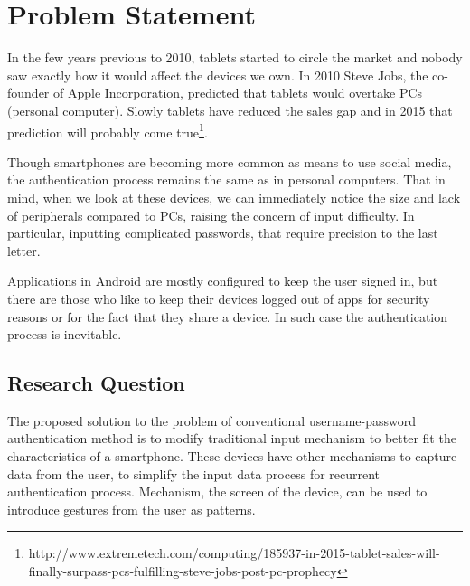 
\chapter{Problem Statement} %

In the few years previous to 2010, tablets started to circle the market and nobody saw exactly how it would affect the devices we own. In 2010 Steve Jobs, the co-founder of Apple Incorporation, predicted that tablets would overtake PCs (personal computer). Slowly tablets have reduced the sales gap and in 2015 that prediction will probably come true\footnote[11]{http://www.extremetech.com/computing/185937-in-2015-tablet-sales-will-finally-surpass-pcs-fulfilling-steve-jobs-post-pc-prophecy}.

Though smartphones are becoming more common as means to use social media, the authentication process remains the same as in personal computers. That in mind, when we look at these devices, we can immediately notice the size and lack of peripherals compared to PCs, raising the concern of input difficulty. In particular, inputting complicated passwords, that require precision to the last letter. 

Applications in Android are mostly configured to keep the user signed in, but there are those who like to keep their devices logged out of apps for security reasons or for the fact that they share a device. In such case the authentication process is inevitable.




\ifpdf
    \graphicspath{{X/figures/PNG/}{X/figures/PDF/}{X/figures/}}
\else
    \graphicspath{{X/figures/EPS/}{X/figures/}}
\fi

\section{Research Question}
The proposed solution to the problem of conventional username-password authentication method is to modify traditional input mechanism to better fit the characteristics of a smartphone. These devices have other mechanisms to capture data from the user, to simplify the input data process for recurrent authentication process. Mechanism, the screen of the device, can be used to introduce gestures from the user as patterns. 

